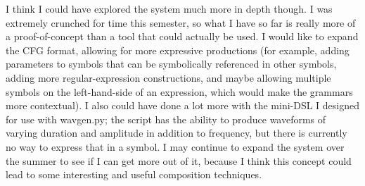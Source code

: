 \documentclass[11pt]{article}
\begin{document}
I think I could have explored the system much more in depth though.  I was
extremely crunched for time this semester, so what I have so far is really
more of a proof-of-concept than a tool that could actually be used.  I would
like to expand the CFG format, allowing for more expressive productions (for
example, adding parameters to symbols that can be symbolically referenced in
other symbols, adding more regular-expression constructions, and maybe
allowing multiple symbols on the left-hand-side of an expression, which would
make the grammars more contextual).  I also could have done a lot more with
the mini-DSL I designed for use with wavgen.py; the script has the ability to
produce waveforms of varying duration and amplitude in addition to frequency,
but there is currently no way to express that in a symbol.  I may continue to
expand the system over the summer to see if I can get more out of it, because
I think this concept could lead to some interesting and useful composition
techniques.
\end{document}
